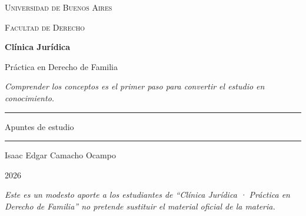 \documentclass[12pt,oneside]{book}
\newcommand{\universidad}{Universidad de Buenos Aires}
\newcommand{\facultad}{Facultad de Derecho}
\newcommand{\materia}{Clínica Jurídica · Práctica en Derecho de Familia}
\newcommand{\materiacorta}{Clínica Jurídica}
\newcommand{\autor}{Isaac Edgar Camacho Ocampo}
\newcommand{\anio}{2026}
\begin{document}
\begin{titlepage}

\thispagestyle{empty}

\begin{center}

\vspace*{1cm}

{\large \textsc{\universidad}}

\vspace{0.2cm}

{\large \textsc{\facultad}}

\vspace{3cm}

{\Huge \textbf{\materiacorta}}

\vspace{1cm}

{\LARGE Práctica en Derecho de Familia}

\vspace{0.8cm}

\textit{Comprender los conceptos es el primer paso para convertir el estudio en conocimiento.}

\vspace{1.2cm}

\rule{0.70\textwidth}{0.5pt}

\vspace{0.5cm}

{\large Apuntes de estudio}

\vspace{0.5cm}

\rule{0.70\textwidth}{0.5pt}

\vfill

{\large \autor}

\vspace{0.3cm}

{\large \anio}

\end{center}

\vfill

\begin{flushleft}
\textit{Este es un modesto aporte a los estudiantes de ``\materia'' no pretende sustituir el material oficial de la materia.}
\end{flushleft}

\end{titlepage}

\tableofcontents
\end{document}
